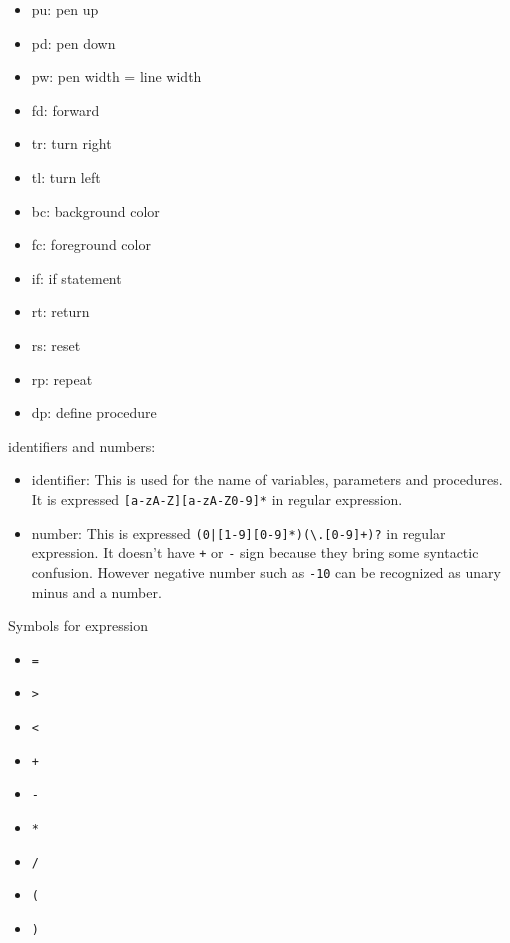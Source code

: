 \begin{itemize}
\tightlist
\item
  pu: pen up
\item
  pd: pen down
\item
  pw: pen width = line width
\item
  fd: forward
\item
  tr: turn right
\item
  tl: turn left
\item
  bc: background color
\item
  fc: foreground color
\item
  if: if statement
\item
  rt: return
\item
  rs: reset
\item
  rp: repeat
\item
  dp: define procedure
\end{itemize}

identifiers and numbers:

\begin{itemize}
\tightlist
\item
  identifier: This is used for the name of variables, parameters and
  procedures. It is expressed
  \passthrough{\lstinline![a-zA-Z][a-zA-Z0-9]*!} in regular expression.
\item
  number: This is expressed
  \passthrough{\lstinline!(0|[1-9][0-9]*)(\\.[0-9]+)?!} in regular
  expression. It doesn't have \passthrough{\lstinline!+!} or
  \passthrough{\lstinline!-!} sign because they bring some syntactic
  confusion. However negative number such as
  \passthrough{\lstinline!-10!} can be recognized as unary minus and a
  number.
\end{itemize}

Symbols for expression

\begin{itemize}
\tightlist
\item
  \passthrough{\lstinline!=!}
\item
  \passthrough{\lstinline!>!}
\item
  \passthrough{\lstinline!<!}
\item
  \passthrough{\lstinline!+!}
\item
  \passthrough{\lstinline!-!}
\item
  \passthrough{\lstinline!*!}
\item
  \passthrough{\lstinline!/!}
\item
  \passthrough{\lstinline!(!}
\item
  \passthrough{\lstinline!)!}
\end{itemize}

